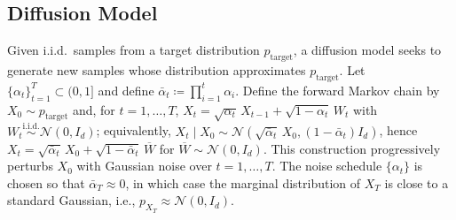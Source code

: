 \documentclass{article}
\begin{document}
\subsection{Diffusion Model} 

Given i.i.d.\ samples from a target distribution $p_{\text{target}}$, a diffusion model seeks to generate new samples whose distribution approximates $p_{\text{target}}$.
Let $\{\alpha_t\}_{t=1}^T\subset(0,1]$ and define $\bar{\alpha}_t\coloneqq \prod_{i=1}^t\alpha_i$.
Define the forward Markov chain by \(X_0\sim p_{\text{target}}\) and, for \(t=1,\dots,T\), \(X_t=\sqrt{\alpha_t}\,X_{t-1}+\sqrt{1-\alpha_t}\,W_t\) with \(W_t\stackrel{\text{i.i.d.}}{\sim}\mathcal N(0,I_d)\); equivalently, \(X_t\mid X_0\sim \mathcal N(\sqrt{\bar\alpha_t}\,X_0,(1-\bar\alpha_t)I_d)\), hence \(X_t=\sqrt{\bar\alpha_t}\,X_0+\sqrt{1-\bar\alpha_t}\,\overline W\) for \(\overline W\sim\mathcal N(0,I_d)\).
This construction progressively perturbs $X_0$ with Gaussian noise over $t=1,\ldots,T$.
The noise schedule $\{\alpha_t\}$ is chosen so that $\bar{\alpha}_T\approx 0$, in which case the marginal distribution of $X_T$ is close to a standard Gaussian, i.e., $p_{X_T}\approx \mathcal N(0,I_d)$.
\end{document}
